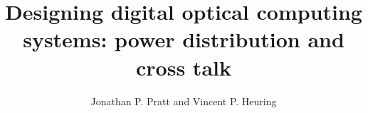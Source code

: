 %
\newcommand{\MF}{{\large{\manual META}\-{\manual FONT}}}
\newcommand{\manual}{rm}        %
\newcommand\bs{\char '134 }     %
%


\title{Designing digital optical computing systems:      power
distribution and cross talk}

\author{Jonathan P. Pratt and Vincent P. Heuring }

\address{
When this work was performed, both the authors were with the Boulder
Optoelectronic Computing Systems Center and Department of Electrical and
Computer Engineering, University of Colorado, Campus Box 425, Boulder,
Colorado 80309-0425.  They are now with the Department of Radiology,
University of Colorado Health Sciences Center, Box A034, 4200 East Ninth
Avenue, Denver, Colorado 80262.  }

